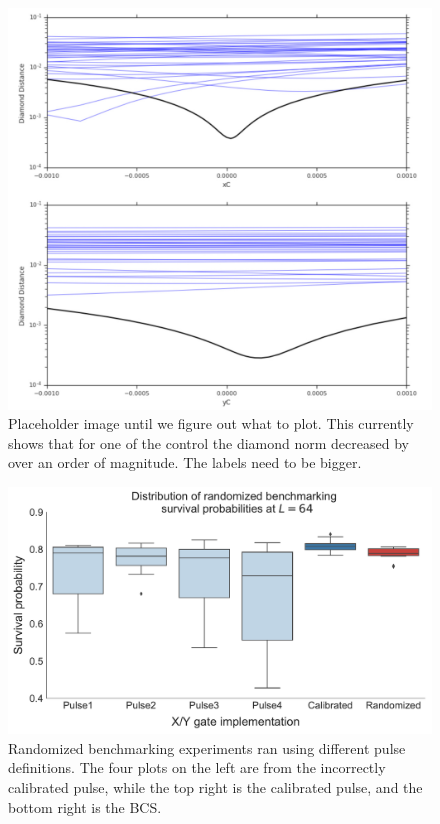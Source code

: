 \documentclass[aps,nofootinbib,pra,notitlepage,twocolumn]{revtex4-1}
\begin{document}
\begin{figure}\label{fig:num}
  \centering
  \includegraphics[width=\columnwidth]{placeholdernumerical.pdf}
  \caption{Placeholder image until we figure out what to plot. This currently shows that for one of the control the diamond norm decreased by over an order of magnitude. The labels need to be bigger.}
  \label{fig:rb}
\end{figure}


\begin{figure}
  \centering
  \includegraphics[width=\columnwidth]{rb_data.pdf}
  \caption{Randomized benchmarking experiments ran using different pulse definitions. The four plots on the left are from the incorrectly calibrated pulse, while the top right is the calibrated pulse, and the bottom right is the BCS.}
  \label{fig:rb}
\end{figure}
\end{document}
